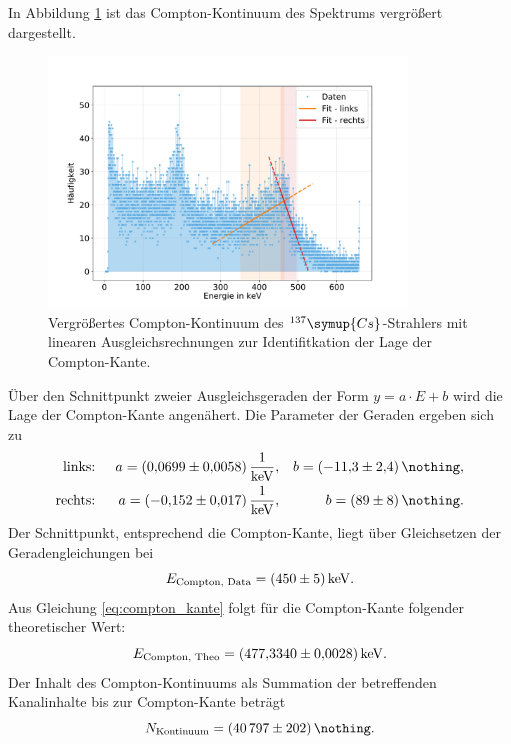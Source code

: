 In Abbildung \ref{fig:cs_kontinuum} ist das Compton-Kontinuum des Spektrums vergrößert dargestellt.
\begin{figure}[h!]
  \centering
  \includegraphics[width=0.85\textwidth]{content/images/caesium_kontinuum.pdf}
  \caption{Vergrößertes Compton-Kontinuum des $^{137}\symup{Cs}$-Strahlers mit linearen Ausgleichsrechnungen zur Identifitkation der Lage der Compton-Kante.}
  \label{fig:cs_kontinuum}
\end{figure}
Über den Schnittpunkt zweier Ausgleichsgeraden der Form $y = a \cdot E + b$ wird die Lage der Compton-Kante angenähert.
Die Parameter der Geraden ergeben sich zu
\begin{align*}
	\text{links: }  && a = \SI{0.0699 (58)}{\frac{1}{\kilo \electronvolt}}, && b = \SI{-11.3 (24)}{\nothing}, \\
	\text{rechts: } && a = \SI{-0.152 (17)}{\frac{1}{\kilo \electronvolt}}, && b = \SI{ 89 (8)}{\nothing}. \\
\end{align*}
Der Schnittpunkt, entsprechend die Compton-Kante, liegt über Gleichsetzen der Geradengleichungen bei
\begin{equation*}
	E_{\text{Compton, Data}} = \SI{450 (5)}{\kilo \electronvolt}.
\end{equation*}
Aus Gleichung \eqref{eq:compton_kante} folgt für die Compton-Kante folgender theoretischer Wert:
\begin{equation*}
	E_{\text{Compton, Theo}} = \SI{477.3340 (28)}{\kilo \electronvolt}.
\end{equation*}
Der Inhalt des Compton-Kontinuums als Summation der betreffenden Kanalinhalte bis zur Compton-Kante beträgt
\begin{equation*}
	N_{\text{Kontinuum}} = \SI{40797 (202)}{\nothing}. %
\end{equation*}
\FloatBarrier

